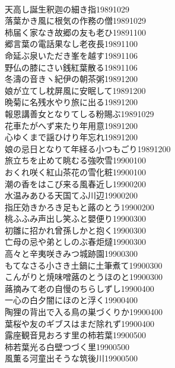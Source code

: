 \begin{multicols}{2}
\\天高し誕生釈迦の細き指\hfill{19891029}
\\落葉かき風に根気の作務の僧\hfill{19891029}
\\柿届く家なき故郷の友も老ひ\hfill{19891100}
\\郷言葉の電話果なし老夜長\hfill{19891100}
\\命延ぶ泉いただき峯を越す\hfill{19891106}
\\野仏の膝にさい銭紅葉散る\hfill{19891106}
\\冬濤の音きヽ紀伊の朝茶粥\hfill{19891200}
\\娘が立てし枕屏風に安眠して\hfill{19891200}
\\晩菊に名残水やり旅に出る\hfill{19891200}
\\報恩講善女となりてしる粉賜ぶ\hfill{19891029}
\\花車たがへず来たり年用意\hfill{19891200}
\\心ゆくまで謡ひけり年忘れ\hfill{19891200}
\\娘の忌日となりて年経る小つもごり\hfill{19891200}
\\旅立ちを止めて眺むる強吹雪\hfill{19900100}
\\おくれ咲く紅山茶花の雪化粧\hfill{19900100}
\\潮の香をはこび来る風春近し\hfill{19900200}
\\水温みあひる天国てふ川辺\hfill{19900200}
\\指圧効きかろき足もと蕗のとう\hfill{19900200}
\\桃ふふみ声出し笑ふと嬰便り\hfill{19900300}
\\初雛に招かれ曾孫しかと抱く\hfill{19900300}
\\亡母の忌や弟としのぶ春炬燵\hfill{19900300}
\\高々と辛夷咲きみつ城跡園\hfill{19900300}
\\もてなさる小さき土鍋に土筆煮て\hfill{19900300}
\\こんがりと焼味噌蕗のとうほのと\hfill{19900300}
\\蕗摘みて老の自慢のちらしずし\hfill{19900400}
\\一心の白夕闇にほのと浮く\hfill{19900400}
\\陶狸の背出で入る鳥の巣づくりか\hfill{19900400}
\\葉桜や友のギブスはまだ除れず\hfill{19900400}
\\露座観音見おろす里の柿若葉\hfill{19900500}
\\柿若葉光る白壁つづく里\hfill{19900500}
\\風薫る河童出そうな筑後川\hfill{19900500}

\end{multicols}
